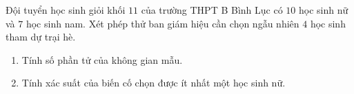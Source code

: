 \begin{bt}%
	Đội tuyển học sinh giỏi khối $11$ của trường THPT B Bình Lục có $10$ học sinh nữ và $7$ học sinh nam. Xét phép thử ban giám hiệu cần chọn ngẫu nhiên $4$ học sinh tham dự trại hè.
		\begin{enumerate}
			\item Tính số phần tử của không gian mẫu.
			\item Tính xác suất của biến cố chọn được ít nhất một học sinh nữ.
		\end{enumerate}
\end{bt}

